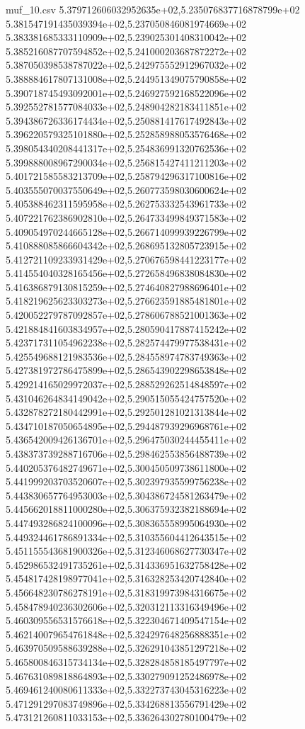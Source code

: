 \begin{filecontents*}{muf_10.csv}
5.379712606032952635e+02,5.235076837716878799e+02
5.381547191435039394e+02,5.237050846081974669e+02
5.383381685333110909e+02,5.239025301408310042e+02
5.385216087707594852e+02,5.241000203687872272e+02
5.387050398538787022e+02,5.242975552912967032e+02
5.388884617807131008e+02,5.244951349075790858e+02
5.390718745493092001e+02,5.246927592168522096e+02
5.392552781577084033e+02,5.248904282183411851e+02
5.394386726336174434e+02,5.250881417617492843e+02
5.396220579325101880e+02,5.252858988053576468e+02
5.398054340208441317e+02,5.254836991320762536e+02
5.399888008967290034e+02,5.256815427411211203e+02
5.401721585583213709e+02,5.258794296317100816e+02
5.403555070037550649e+02,5.260773598030600624e+02
5.405388462311595958e+02,5.262753332543961733e+02
5.407221762386902810e+02,5.264733499849371583e+02
5.409054970244665128e+02,5.266714099939226799e+02
5.410888085866604342e+02,5.268695132805723915e+02
5.412721109233931429e+02,5.270676598441223177e+02
5.414554040328165456e+02,5.272658496838084830e+02
5.416386879130815259e+02,5.274640827988696401e+02
5.418219625623303273e+02,5.276623591885481801e+02
5.420052279787092857e+02,5.278606788521001363e+02
5.421884841603834957e+02,5.280590417887415242e+02
5.423717311054962238e+02,5.282574479977538431e+02
5.425549688121983536e+02,5.284558974783749363e+02
5.427381972786475899e+02,5.286543902298653848e+02
5.429214165029972037e+02,5.288529262514848597e+02
5.431046264834149042e+02,5.290515055424757520e+02
5.432878272180442991e+02,5.292501281021313844e+02
5.434710187050654895e+02,5.294487939296968761e+02
5.436542009426136701e+02,5.296475030244455411e+02
5.438373739288716706e+02,5.298462553856488739e+02
5.440205376482749671e+02,5.300450509738611800e+02
5.441999203703520607e+02,5.302397935599756238e+02
5.443830657764953003e+02,5.304386724581263479e+02
5.445662018811000280e+02,5.306375932382188694e+02
5.447493286824100096e+02,5.308365558995064930e+02
5.449324461786891334e+02,5.310355604412643515e+02
5.451155543681900326e+02,5.312346068627730347e+02
5.452986532491735261e+02,5.314336951632758428e+02
5.454817428198977041e+02,5.316328253420742840e+02
5.456648230786278191e+02,5.318319973984316675e+02
5.458478940236302606e+02,5.320312113316349496e+02
5.460309556531576618e+02,5.322304671409547154e+02
5.462140079654761848e+02,5.324297648256888351e+02
5.463970509588639288e+02,5.326291043851297218e+02
5.465800846315734134e+02,5.328284858185497797e+02
5.467631089818864893e+02,5.330279091252486978e+02
5.469461240080611333e+02,5.332273743045316223e+02
5.471291297083749896e+02,5.334268813556791429e+02
5.473121260811033153e+02,5.336264302780100479e+02

\end{filecontents*}
